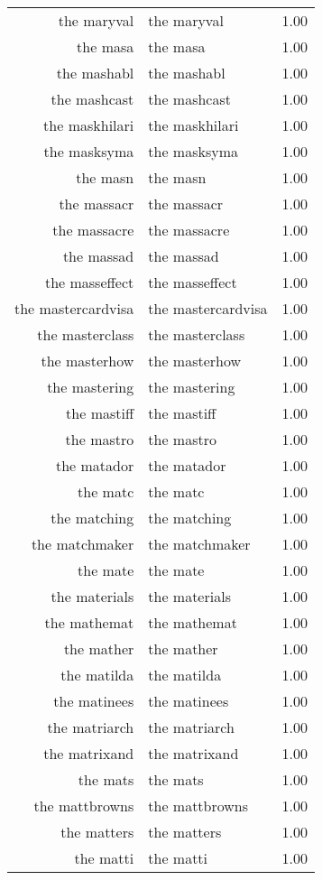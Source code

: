 \begin{table}[ht]
\begin{tabular}{rlr}
  the maryval & the maryval & 1.00 \\ 
  the masa & the masa & 1.00 \\ 
  the mashabl & the mashabl & 1.00 \\ 
  the mashcast & the mashcast & 1.00 \\ 
  the maskhilari & the maskhilari & 1.00 \\ 
  the masksyma & the masksyma & 1.00 \\ 
  the masn & the masn & 1.00 \\ 
  the massacr & the massacr & 1.00 \\ 
  the massacre & the massacre & 1.00 \\ 
  the massad & the massad & 1.00 \\ 
  the masseffect & the masseffect & 1.00 \\ 
  the mastercardvisa & the mastercardvisa & 1.00 \\ 
  the masterclass & the masterclass & 1.00 \\ 
  the masterhow & the masterhow & 1.00 \\ 
  the mastering & the mastering & 1.00 \\ 
  the mastiff & the mastiff & 1.00 \\ 
  the mastro & the mastro & 1.00 \\ 
  the matador & the matador & 1.00 \\ 
  the matc & the matc & 1.00 \\ 
  the matching & the matching & 1.00 \\ 
  the matchmaker & the matchmaker & 1.00 \\ 
  the mate & the mate & 1.00 \\ 
  the materials & the materials & 1.00 \\ 
  the mathemat & the mathemat & 1.00 \\ 
  the mather & the mather & 1.00 \\ 
  the matilda & the matilda & 1.00 \\ 
  the matinees & the matinees & 1.00 \\ 
  the matriarch & the matriarch & 1.00 \\ 
  the matrixand & the matrixand & 1.00 \\ 
  the mats & the mats & 1.00 \\ 
  the mattbrowns & the mattbrowns & 1.00 \\ 
  the matters & the matters & 1.00 \\ 
  the matti & the matti & 1.00 \\ 

\end{tabular}
\end{table}
